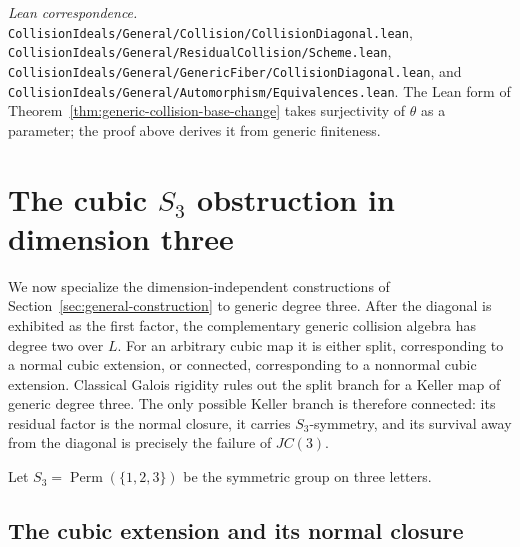 \documentclass[11pt]{article}
\theoremstyle{remark}
\theoremstyle{definition}
\newcommand{\leanpath}[1]{\texttt{\nolinkurl{#1}}}
\newenvironment{leanfiles}
  {\par\medskip\begingroup\footnotesize\raggedright\noindent
   \textit{Lean correspondence.}\ }
  {\par\endgroup\medskip}
\begin{document}
\begin{leanfiles}
\leanpath{CollisionIdeals/General/Collision/CollisionDiagonal.lean},
\leanpath{CollisionIdeals/General/ResidualCollision/Scheme.lean},
\leanpath{CollisionIdeals/General/GenericFiber/CollisionDiagonal.lean}, and
\leanpath{CollisionIdeals/General/Automorphism/Equivalences.lean}.  The Lean form of
Theorem~\ref{thm:generic-collision-base-change} takes surjectivity of
\(\theta\) as a parameter; the proof above derives it from generic
finiteness.
\end{leanfiles}


\section{\texorpdfstring{The cubic \(S_3\) obstruction in dimension three}
  {The cubic S3 obstruction in dimension three}}
\label{sec:cubic-s3-obstruction}

We now specialize the dimension-independent constructions of
Section~\ref{sec:general-construction} to generic degree three.  After the
diagonal is exhibited as the first factor, the complementary
generic collision algebra has degree two over \(L\).  For an
arbitrary cubic map it is either split,
corresponding to a normal cubic extension, or connected, corresponding to
a nonnormal cubic extension.  Classical Galois rigidity rules out the
split branch for a Keller map of generic degree three.  The only possible
Keller branch is therefore connected: its residual factor is the normal closure,
it carries \(S_3\)-symmetry, and its survival away from the diagonal is
precisely the failure of \(JC(3)\).

Let \(S_3=\operatorname{Perm}(\{1,2,3\})\) be the symmetric group on
three letters.

\subsection{The cubic extension and its normal closure}
\label{sec:cubic-extension}
\end{document}
